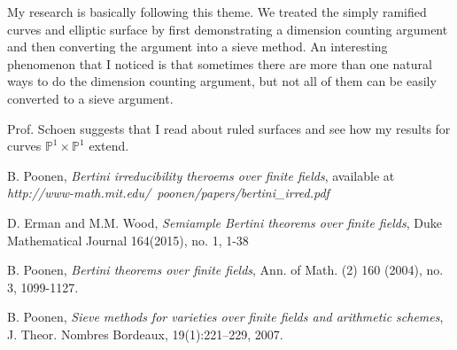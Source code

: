 \documentclass[12pt]{article}
\theoremstyle{plain}
\theoremstyle{definition}
\newcommand{\IP}{\mathbb{P}}
\newcommand{\<}{\langle}
\renewcommand{\>}{\rangle}
\begin{document}
My research is basically following this theme. We treated the simply ramified curves and elliptic surface by first demonstrating a dimension counting argument and then converting the argument into a sieve method. An interesting phenomenon that I noticed is that sometimes there are more than one natural ways to do the dimension counting argument, but not all of them can be easily converted to a sieve argument. 

Prof. Schoen suggests that I read about ruled surfaces and see how my results for curves $\IP^1 \times \IP^1$ extend. 

\begin{thebibliography}{9}
B. Poonen, \textit{Bertini irreducibility theroems over finite fields}, available at \textit{http://www-math.mit.edu/~poonen/papers/bertini\_irred.pdf}

D. Erman and M.M. Wood, \textit{Semiample Bertini theorems over finite fields}, Duke Mathematical Journal 164(2015), no. 1, 1-38

B. Poonen, \textit{Bertini theorems over finite fields}, Ann. of Math. (2) 160 (2004), no. 3, 1099-1127.

B. Poonen, \textit{Sieve methods for varieties over finite fields and arithmetic schemes}, J. Theor. Nombres Bordeaux, 19(1):221–229, 2007.


\end{thebibliography}
\end{document}
